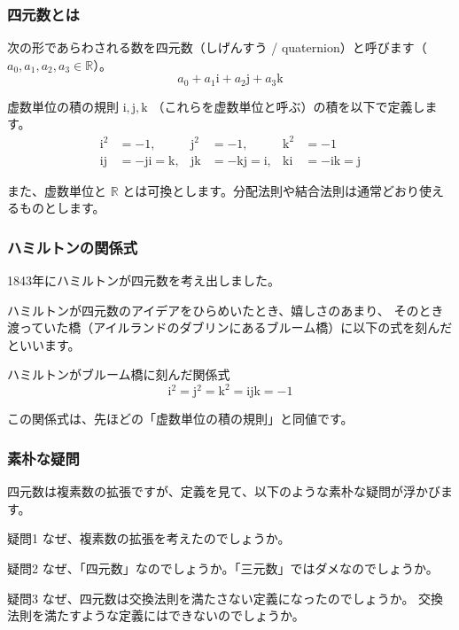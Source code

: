 \documentclass{beamer}
\newcommand{\ii}{\mathrm{i}}
\newcommand{\jj}{\mathrm{j}}
\newcommand{\kk}{\mathrm{k}}
\begin{document}
\begin{frame}
    \frametitle{四元数とは}

    次の形であらわされる数を四元数（しげんすう / quaternion）と呼びます（\(a_0, a_1, a_2, a_3 \in \mathbb{R}\)）。
    \[
        a_0 + a_1 \ii + a_2 \jj + a_3 \kk
    \]

    \begin{block}{虚数単位の積の規則}
        \(\ii, \jj, \kk\) （これらを虚数単位と呼ぶ）の積を以下で定義します。
        \begin{align*}
            \ii^2   & = -1,             & \jj^2   & = -1,             & \kk^2   & = -1             \\
            \ii \jj & = -\jj \ii = \kk, & \jj \kk & = -\kk \jj = \ii, & \kk \ii & = -\ii \kk = \jj
        \end{align*}
    \end{block}

    また、虚数単位と \(\mathbb{R}\) とは可換とします。分配法則や結合法則は通常どおり使えるものとします。
\end{frame}

\begin{frame}
    \frametitle{ハミルトンの関係式}

    1843年にハミルトンが四元数を考え出しました。

    \bigskip

    ハミルトンが四元数のアイデアをひらめいたとき、嬉しさのあまり、
    そのとき渡っていた橋（アイルランドのダブリンにあるブルーム橋）に以下の式を刻んだといいます。

    \begin{block}{ハミルトンがブルーム橋に刻んだ関係式}
        \[
            \ii^2 = \jj^2 = \kk^2 = \ii \jj \kk = -1
        \]
    \end{block}

    この関係式は、先ほどの「虚数単位の積の規則」と同値です。
\end{frame}

\begin{frame}
    \frametitle{素朴な疑問}

    四元数は複素数の拡張ですが、定義を見て、以下のような素朴な疑問が浮かびます。

    \begin{block}{疑問1}
        なぜ、複素数の拡張を考えたのでしょうか。
    \end{block}

    \begin{block}{疑問2}
        なぜ、「四元数」なのでしょうか。「三元数」ではダメなのでしょうか。
    \end{block}

    \begin{block}{疑問3}
        なぜ、四元数は交換法則を満たさない定義になったのでしょうか。
        交換法則を満たすような定義にはできないのでしょうか。
    \end{block}
\end{frame}
\end{document}
